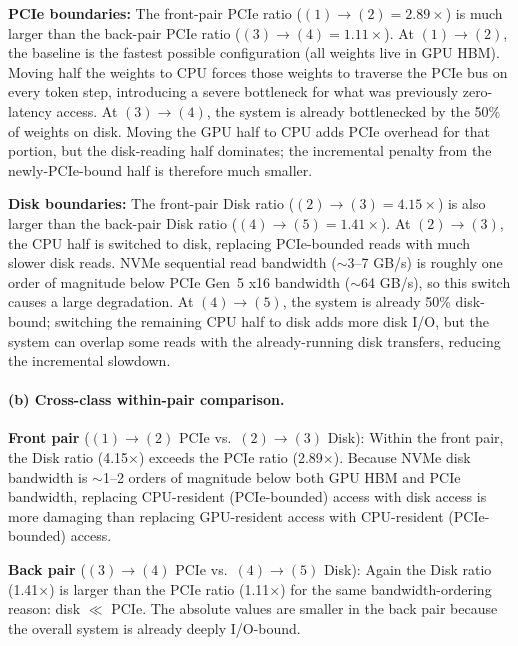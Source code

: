 \documentclass[12pt,a4paper]{article}
\begin{document}
\textbf{PCIe boundaries:}
The front-pair PCIe ratio ($(1)\to(2)=2.89\times$) is much larger than the back-pair PCIe ratio ($(3)\to(4)=1.11\times$).
At $(1)\to(2)$, the baseline is the fastest possible configuration (all weights live in GPU HBM).
Moving half the weights to CPU forces those weights to traverse the PCIe bus on every token step, introducing a severe bottleneck for what was previously zero-latency access.
At $(3)\to(4)$, the system is already bottlenecked by the 50\% of weights on disk.
Moving the GPU half to CPU adds PCIe overhead for that portion, but the disk-reading half dominates; the incremental penalty from the newly-PCIe-bound half is therefore much smaller.

\textbf{Disk boundaries:}
The front-pair Disk ratio ($(2)\to(3)=4.15\times$) is also larger than the back-pair Disk ratio ($(4)\to(5)=1.41\times$).
At $(2)\to(3)$, the CPU half is switched to disk, replacing PCIe-bounded reads with much slower disk reads.
NVMe sequential read bandwidth ($\sim$3--7 GB/s) is roughly one order of magnitude below PCIe Gen~5 x16 bandwidth ($\sim$64 GB/s), so this switch causes a large degradation.
At $(4)\to(5)$, the system is already 50\% disk-bound; switching the remaining CPU half to disk adds more disk I/O, but the system can overlap some reads with the already-running disk transfers, reducing the incremental slowdown.

\paragraph{(b) Cross-class within-pair comparison.}

\textbf{Front pair} ($(1)\to(2)$ PCIe vs.\ $(2)\to(3)$ Disk):
Within the front pair, the Disk ratio (4.15$\times$) exceeds the PCIe ratio (2.89$\times$).
Because NVMe disk bandwidth is $\sim$1--2 orders of magnitude below both GPU HBM and PCIe bandwidth, replacing CPU-resident (PCIe-bounded) access with disk access is more damaging than replacing GPU-resident access with CPU-resident (PCIe-bounded) access.

\textbf{Back pair} ($(3)\to(4)$ PCIe vs.\ $(4)\to(5)$ Disk):
Again the Disk ratio (1.41$\times$) is larger than the PCIe ratio (1.11$\times$) for the same bandwidth-ordering reason: disk $\ll$ PCIe.
The absolute values are smaller in the back pair because the overall system is already deeply I/O-bound.

\newpage

\end{document}
